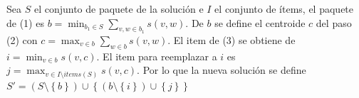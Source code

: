 Sea $S$ el conjunto de paquete de la solución e $I$ el conjunto de ítems, el paquete de (1) es $b = \min_{b_1 \in S}{\sum_{v,w \in b_1}{s(v,w)}}$. De $b$ se define el centroide $c$ del paso (2) con $c = \max_{v \in b}{\sum_{w \in b}{s(v,w)}}$. El item de (3) se obtiene de $i = \min_{v \in b}{s(v,c)}$. El item para reemplazar a $i$ es $j = \max_{v \in I \setminus items(S)}{s(v,c)}$. Por lo que la nueva solución se define $S' = (S \setminus \left\{b\right\}) \cup \left\{(b \setminus \left\{i\right\})\cup\left\{j\right\}\right\}$

